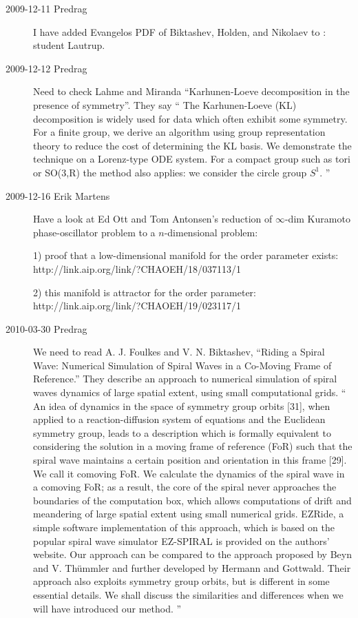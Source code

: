 \begin{description}
\item[2009-12-11 Predrag] I have added Evangelos PDF of Biktashev,
Holden, and Nikolaev to : student Lautrup.

\item[2009-12-12 Predrag] Need to check Lahme and Miranda
``Karhunen-Loeve decomposition in the presence of symmetry''. They say
``
The Karhunen-Loeve (KL) decomposition is
  widely used for data which often exhibit some symmetry.
  For a finite group, we derive an
  algorithm using group representation theory to reduce the
  cost of determining the KL basis. We demonstrate the
  technique on a Lorenz-type ODE system. For a compact group
  such as tori or SO(3,R) the method also applies: we
  consider the circle group $S^1$.
''
                                    \toCB


\item[2009-12-16 Erik Martens] %
Have a look at
Ed Ott and Tom Antonsen's reduction of $\infty$-dim Kuramoto phase-oscillator
problem to a $n$-dimensional problem:

1) proof that a low-dimensional manifold for the order parameter exists:
\\
{http://link.aip.org/link/?CHAOEH/18/037113/1}

2) this manifold is attractor for the order parameter:
\\
{http://link.aip.org/link/?CHAOEH/19/023117/1}

\item[2010-03-30 Predrag] We need to read A. J. Foulkes and V. N.
    Biktashev, ``Riding a Spiral Wave: Numerical
    Simulation of Spiral Waves in a Co-Moving Frame of Reference.''
    They describe an approach to numerical simulation of spiral waves
    dynamics of large spatial extent, using small computational grids.
    `` An idea of dynamics in the space of symmetry group orbits [31],
    when applied to a reaction-diffusion system of equations and the
    Euclidean symmetry group, leads to a description which is formally
    equivalent to considering the solution in a moving frame of
    reference (FoR) such that the spiral wave maintains a certain
    position and orientation in this frame [29]. We call it comoving
    FoR. We calculate the dynamics of the spiral wave in a comoving
    FoR; as a result, the core of the spiral never approaches the
    boundaries of the computation box, which allows computations of
    drift and meandering of large spatial extent using small numerical
    grids. EZRide, a simple software implementation of this approach,
    which is based on the popular spiral wave simulator EZ-SPIRAL is
    provided on the authors' website. Our approach can be compared to
    the approach proposed by Beyn and V. Th\"ummler and
    further developed by Hermann and Gottwald. Their
    approach also exploits symmetry group orbits, but is different in
    some essential details. We shall discuss the similarities and
    differences when we will have introduced our method. ''


\end{description}
